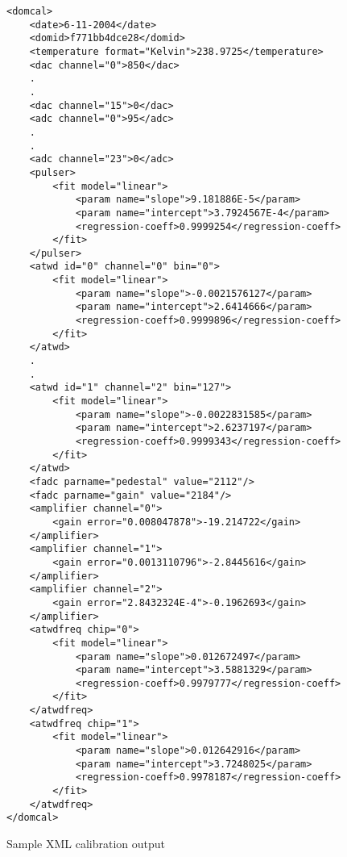 \documentclass[10pt]{article}
\begin{document}
\begin{figure}
\begin{footnotesize}
\begin{verbatim}
<domcal>
    <date>6-11-2004</date>
    <domid>f771bb4dce28</domid>
    <temperature format="Kelvin">238.9725</temperature>
    <dac channel="0">850</dac>
    .
    .
    <dac channel="15">0</dac>
    <adc channel="0">95</adc>
    .
    .
    <adc channel="23">0</adc>
    <pulser>
        <fit model="linear">
            <param name="slope">9.181886E-5</param>
            <param name="intercept">3.7924567E-4</param>
            <regression-coeff>0.9999254</regression-coeff>
        </fit>
    </pulser>
    <atwd id="0" channel="0" bin="0">
        <fit model="linear">
            <param name="slope">-0.0021576127</param>
            <param name="intercept">2.6414666</param>
            <regression-coeff>0.9999896</regression-coeff>
        </fit>
    </atwd>
    .
    .
    <atwd id="1" channel="2" bin="127">
        <fit model="linear">
            <param name="slope">-0.0022831585</param>
            <param name="intercept">2.6237197</param>
            <regression-coeff>0.9999343</regression-coeff>
        </fit>
    </atwd>
    <fadc parname="pedestal" value="2112"/>
    <fadc parname="gain" value="2184"/>
    <amplifier channel="0">
        <gain error="0.008047878">-19.214722</gain>
    </amplifier>
    <amplifier channel="1">
        <gain error="0.0013110796">-2.8445616</gain>
    </amplifier>
    <amplifier channel="2">
        <gain error="2.8432324E-4">-0.1962693</gain>
    </amplifier>
    <atwdfreq chip="0">
        <fit model="linear">
            <param name="slope">0.012672497</param>
            <param name="intercept">3.5881329</param>
            <regression-coeff>0.9979777</regression-coeff>
        </fit>
    </atwdfreq>
    <atwdfreq chip="1">
        <fit model="linear">
            <param name="slope">0.012642916</param>
            <param name="intercept">3.7248025</param>
            <regression-coeff>0.9978187</regression-coeff>
        </fit>
    </atwdfreq>
</domcal>
\end{verbatim}
\end{footnotesize}
\caption{Sample XML calibration output}
\label{fig:xml}
\end{figure}
\end{document}
